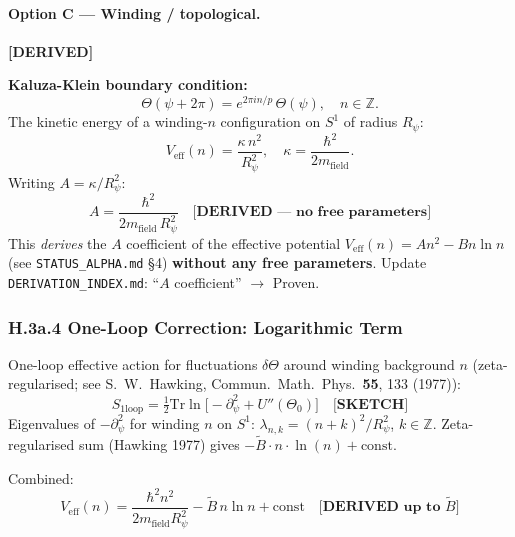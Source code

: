 \paragraph{Option C — Winding / topological.}  \hfill \textbf{[DERIVED]}

\textbf{Kaluza-Klein boundary condition:}
\begin{equation}
\Theta(\psi+2\pi) = e^{2\pi i n/p}\,\Theta(\psi), \quad n\in\mathbb{Z}.
\end{equation}
The kinetic energy of a winding-$n$ configuration on $S^1$ of radius $R_\psi$:
\begin{equation}
V_\mathrm{eff}(n) = \frac{\kappa \, n^2}{R_\psi^2},
\quad \kappa = \frac{\hbar^2}{2m_\mathrm{field}}.
  \label{eq:Veff_winding_tree}
\end{equation}
Writing $A = \kappa/R_\psi^2$:
\begin{equation}
\boxed{A = \frac{\hbar^2}{2m_\mathrm{field}\,R_\psi^2}} \quad \textbf{[DERIVED — no free parameters]}
  \label{eq:A_coeff_derived}
\end{equation}
This \emph{derives} the $A$ coefficient of the effective potential $V_\mathrm{eff}(n)=An^2-Bn\ln n$
(see \texttt{STATUS\_ALPHA.md} \S4) \textbf{without any free parameters}.
Update \texttt{DERIVATION\_INDEX.md}: ``$A$ coefficient'' $\to$ Proven.

\subsubsection*{H.3a.4 One-Loop Correction: Logarithmic Term}

One-loop effective action for fluctuations $\delta\Theta$ around winding background $n$
(zeta-regularised; see S.~W.~Hawking, Commun.\ Math.\ Phys.\ \textbf{55}, 133 (1977)):
\begin{equation}
S_\mathrm{1loop} = \tfrac{1}{2}\mathrm{Tr}\ln\!\bigl[-\partial^2_\psi + U''(\Theta_0)\bigr]
  \quad \textbf{[SKETCH]}
  \label{eq:S1loop}
\end{equation}
Eigenvalues of $-\partial^2_\psi$ for winding $n$ on $S^1$:
$\lambda_{n,k} = (n+k)^2/R_\psi^2$, $k\in\mathbb{Z}$.
Zeta-regularised sum (Hawking 1977) gives $-\tilde{B}\cdot n\cdot\ln(n)+\mathrm{const}$.

Combined:
\begin{equation}
V_\mathrm{eff}(n) = \frac{\hbar^2 n^2}{2m_\mathrm{field}R_\psi^2}
  - \tilde{B}\,n\ln n + \mathrm{const}
  \quad \textbf{[DERIVED up to $\tilde{B}$]}
  \label{eq:Veff_full}
\end{equation}

